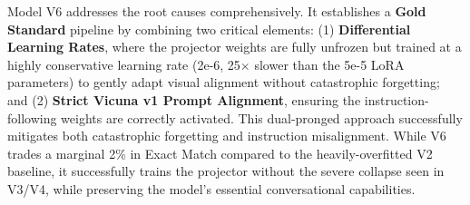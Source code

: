Model V6 addresses the root causes comprehensively. It establishes a \textbf{Gold Standard} pipeline by combining two critical elements: (1) \textbf{Differential Learning Rates}, where the projector weights are fully unfrozen but trained at a highly conservative learning rate (2e-6, 25$\times$ slower than the 5e-5 LoRA parameters) to gently adapt visual alignment without catastrophic forgetting; and (2) \textbf{Strict Vicuna v1 Prompt Alignment}, ensuring the instruction-following weights are correctly activated. This dual-pronged approach successfully mitigates both catastrophic forgetting and instruction misalignment. While V6 trades a marginal 2\% in Exact Match compared to the heavily-overfitted V2 baseline, it successfully trains the projector without the severe collapse seen in V3/V4, while preserving the model's essential conversational capabilities.
